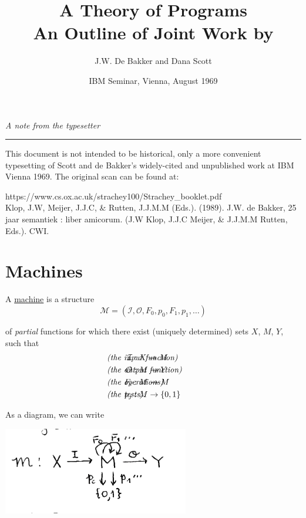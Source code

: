 \documentclass{article}
\title{A Theory of Programs \\ 

\large{
    An Outline of Joint Work by
}}
\author{J.W. De Bakker and Dana Scott}
\date{IBM Seminar, Vienna, August 1969}
\newcommand{\scM}{\mathscr{M}}
\newcommand{\mcI}{\mathcal{I}}
\newcommand{\mcO}{\mathcal{O}}
\begin{document}
\begin{center}
    \large{\textit{A note from the typesetter}} \\
    \hrule
\end{center}

This document is not intended to be historical, only a more convenient typesetting of Scott and de Bakker's widely-cited and unpublished work at IBM Vienna 1969. The original scan can be found at: 

\begin{framed}
https://www.cs.ox.ac.uk/strachey100/Strachey\_booklet.pdf \\

Klop, J.W, Meijer, J.J.C, \& Rutten, J.J.M.M (Eds.). (1989). J.W. de Bakker, 25 jaar semantiek : liber amicorum. (J.W Klop, J.J.C Meijer, \& J.J.M.M Rutten, Eds.). CWI.
\end{framed}

\maketitle

\section{Machines}

A \underline{machine} is a structure 
\begin{equation*}
    \scM = (\mcI, \mcO, F_0, p_0, F_1, p_1, \ldots)
\end{equation*}

of \textit{partial} functions for which there exist (uniquely determined) sets $X$, $M$, $Y$, such that 
\begin{align*}
    \mcI & : X \to M && \hspace{-100pt} \textrm{\textit{(the input function)}} \\
    \mcO & : M \to Y && \hspace{-100pt}\textrm{\textit{(the output function)}} \\
    F_i & : M \to M && \hspace{-100pt}\textrm{\textit{(the operations)}} \\
    p_j & : M \to \{0, 1\} && \hspace{-100pt}\textrm{\textit{(the tests)}}. \\
\end{align*}

As a diagram, we can write
\begin{center}
    \includegraphics[width=230pt]{dg1.png}
\end{center}
\end{document}
